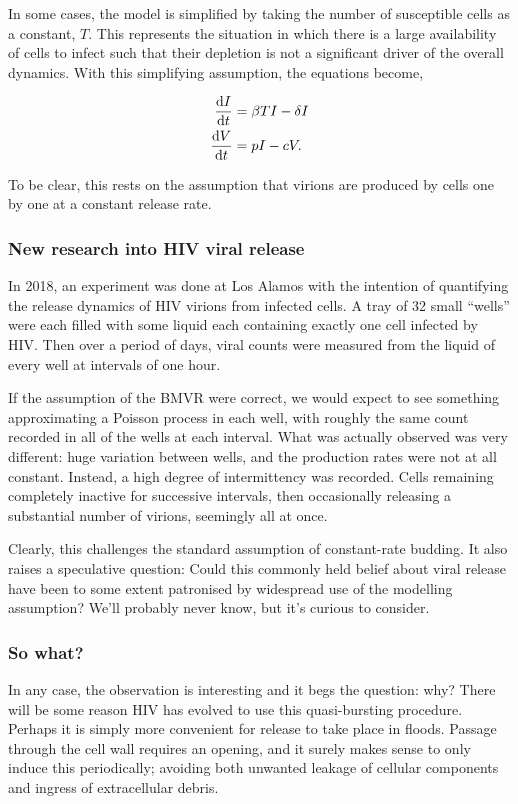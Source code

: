 \noindent
In some cases, the model is simplified by taking the number of susceptible cells as a constant, $T$. This represents the situation in which there is a large availability of cells to infect such that their depletion is not a significant driver of the overall dynamics. With this simplifying assumption, the equations become,

\begin{align*}
\displaystyle\frac{{\rm d} I}{{\rm d} t} & = \beta TI - \delta I\\
\displaystyle\frac{{\rm d} V}{{\rm d} t}& = p I - c V.
\end{align*}

\noindent
To be clear, this rests on the assumption that virions are produced by cells one by one at a constant release rate.


\subsubsection*{New research into HIV viral release}

In 2018, an experiment was done at Los Alamos \cite{hataye2019principles} with the intention of quantifying the release dynamics of HIV virions from infected cells. A tray of 32 small ``wells'' were each filled with some liquid each containing exactly one cell infected by HIV. Then over a period of days, viral counts were measured from the liquid of every well at intervals of one hour.\par

If the assumption of the BMVR were correct, we would expect to see something approximating a Poisson process in each well, with roughly the same count recorded in all of the wells at each interval. What was actually observed was very different: huge variation between wells, and the production rates were not at all constant. Instead, a high degree of intermittency was recorded. Cells remaining completely inactive for successive intervals, then occasionally releasing a substantial number of virions, seemingly all at once. \par

Clearly, this challenges the standard assumption of constant-rate budding. It also raises a speculative question: Could this commonly held belief about viral release have been to some extent patronised by widespread use of the modelling assumption? We'll probably never know, but it's curious to consider.\par

\subsubsection*{So what?}
In any case, the observation is interesting and it begs the question: why? There will be some reason HIV has evolved to use this quasi-bursting procedure. Perhaps it is simply more convenient for release to take place in floods. Passage through the cell wall requires an opening, and it surely makes sense to only induce this periodically; avoiding both unwanted leakage of cellular components and ingress of extracellular debris.\par 

